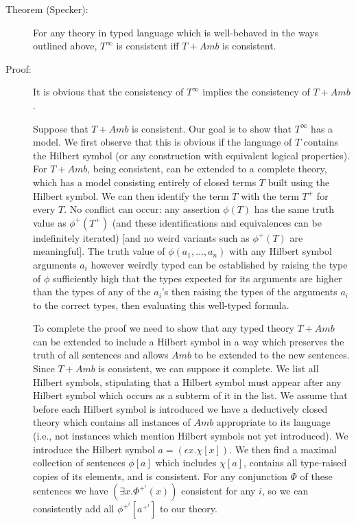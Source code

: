 \documentclass[12pt]{book}
\begin{document}
\begin{description}

\item[Theorem (Specker):] For any theory in typed language which is
well-behaved in the ways outlined above, $T^{\infty}$ is consistent
iff $T + Amb$ is consistent.

\item[Proof:] It is obvious that the consistency of $T^{\infty}$
implies the consistency of $T+Amb$.

Suppose that $T + Amb$ is consistent.  Our goal is to show that
$T^{\infty}$ has a model.  We first observe that this is obvious if
the language of $T$ contains the Hilbert symbol (or any construction
with equivalent logical properties).  For $T+Amb$, being consistent,
can be extended to a complete theory, which has a model consisting
entirely of closed terms $T$ built using the Hilbert symbol.  We can
then identify the term $T$ with the term $T^+$ for every $T$.  No
conflict can occur: any assertion $\phi(T)$ has the same truth value
as $\phi^+(T^+)$ (and these identifications and equivalences can be
indefinitely iterated) [and no weird variants such as $\phi^+(T)$ are
meaningful].  The truth value of $\phi(a_1,\ldots,a_n)$ with any
Hilbert symbol arguments $a_i$ however weirdly typed can be
established by raising the type of $\phi$ sufficiently high that the
types expected for its arguments are higher than the types of any of
the $a_i$'s then raising the types of the arguments $a_i$ to the
correct types, then evaluating this well-typed formula.

To complete the proof we need to show that any typed theory $T+Amb$
can be extended to include a Hilbert symbol in a way which preserves
the truth of all sentences and allows $Amb$ to be extended to the new
sentences.  Since $T+Amb$ is consistent, we can suppose it complete.
We list all Hilbert symbols, stipulating that a Hilbert symbol must
appear after any Hilbert symbol which occurs as a subterm of it in the
list.  We assume that before each Hilbert symbol is introduced we have
a deductively closed theory which contains all instances of $Amb$
appropriate to its language (i.e., not instances which mention Hilbert
symbols not yet introduced).  We introduce the Hilbert symbol
$a=(\epsilon x.\chi[x])$.  We then find a maximal collection of
sentences $\phi[a]$ which includes $\chi[a]$, contains all type-raised
copies of its elements, and is consistent.  For any conjunction $\Phi$ of these
sentences we have $(\exists x.\Phi^{+^i}(x))$ consistent for any $i$, so we
can consistently add all $\phi^{+^i}[a^{+^i}]$ to our theory.


\end{description}
\end{document}
